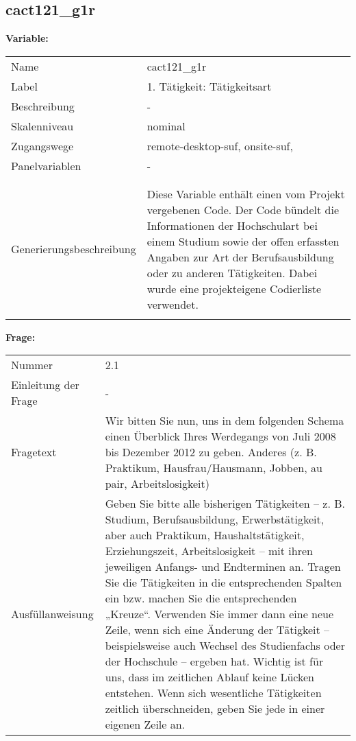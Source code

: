	
	
	\subsection{cact121\_g1r}
	\label{subSection:cact121_g1r}

	\noindent\textbf{Variable:}\\
		\begin{tabular}{lL{11.3cm}}
			\label{tableVariable:cact121_g1r}
			Name & cact121\_g1r \\
			Label & 1. Tätigkeit: Tätigkeitsart  \\
			Beschreibung & - \\
			Skalenniveau & nominal \\
			Zugangswege &
				remote-desktop-suf,
				onsite-suf,
 \\
			Panelvariablen & -
			 \\
			 \\
 \\
					Generierungsbeschreibung & Diese Variable enthält einen vom Projekt vergebenen Code. Der Code bündelt die  Informationen der Hochschulart bei einem Studium sowie der  offen erfassten Angaben zur Art der Berufsausbildung oder zu anderen Tätigkeiten. Dabei wurde eine projekteigene Codierliste verwendet.
				 \\	
			 \\
		\end{tabular}

		\vspace*{1 cm}
		\noindent\textbf{Frage:}\\
		\begin{tabular}{lL{11.3cm}}
			\label{tableQuestion:cact121_g1r}
			Nummer & 2.1 \\
			Einleitung der Frage & - \\
			Fragetext & Wir bitten Sie nun, uns in dem folgenden Schema einen Überblick Ihres Werdegangs von Juli 2008 bis Dezember 2012 zu geben.
Anderes
(z. B. Praktikum, Hausfrau/Hausmann, Jobben, au pair, Arbeitslosigkeit) \\
			Ausfüllanweisung & Geben Sie bitte alle bisherigen Tätigkeiten – z. B. Studium, Berufsausbildung, Erwerbstätigkeit, aber auch Praktikum, Haushaltstätigkeit,
Erziehungszeit, Arbeitslosigkeit – mit ihren jeweiligen Anfangs- und Endterminen an. Tragen Sie die Tätigkeiten in die entsprechenden Spalten ein bzw. machen Sie die entsprechenden „Kreuze“. Verwenden Sie immer dann eine neue Zeile, wenn sich eine Änderung der Tätigkeit – beispielsweise auch Wechsel des Studienfachs oder der Hochschule – ergeben hat. Wichtig ist für uns, dass im zeitlichen Ablauf keine Lücken entstehen. Wenn sich wesentliche Tätigkeiten zeitlich überschneiden, geben Sie jede in einer eigenen Zeile an. \\
		\end{tabular}





